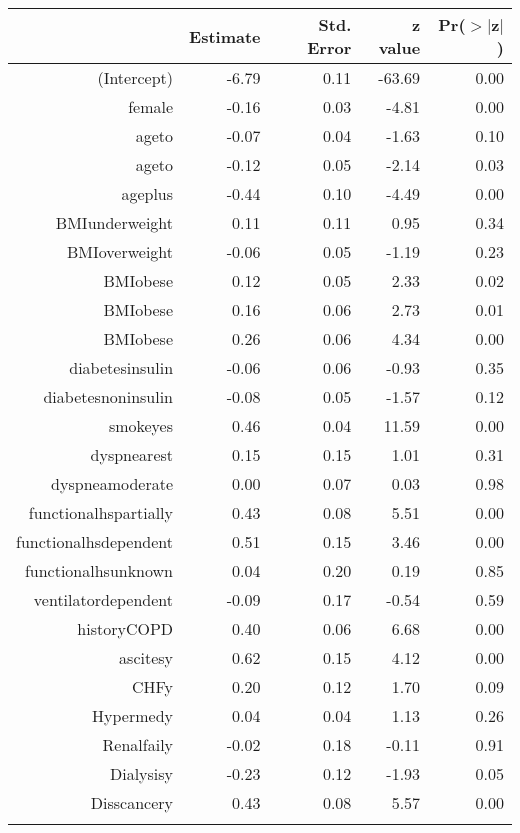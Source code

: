 \bigskip\bigskip
\centering
\begin{tabular}{rrrrr}
  \hline
 & Estimate & Std. Error & z value & Pr($>$$|$z$|$) \\ 
  \hline
(Intercept) & -6.79 & 0.11 & -63.69 & 0.00 \\ 
  female & -0.16 & 0.03 & -4.81 & 0.00 \\ 
  age\-65\-to\-74 & -0.07 & 0.04 & -1.63 & 0.10 \\ 
  age\-75\-to\-84 & -0.12 & 0.05 & -2.14 & 0.03 \\ 
  age\-85\-plus & -0.44 & 0.10 & -4.49 & 0.00 \\ 
  BMI\-underweight & 0.11 & 0.11 & 0.95 & 0.34 \\ 
  BMI\-overweight & -0.06 & 0.05 & -1.19 & 0.23 \\ 
  BMI\-obese\-1 & 0.12 & 0.05 & 2.33 & 0.02 \\ 
  BMI\-obese\-2 & 0.16 & 0.06 & 2.73 & 0.01 \\ 
  BMI\-obese\-3 & 0.26 & 0.06 & 4.34 & 0.00 \\ 
  diabetes\-insulin & -0.06 & 0.06 & -0.93 & 0.35 \\ 
  diabetes\-noninsulin & -0.08 & 0.05 & -1.57 & 0.12 \\ 
  smoke\-yes & 0.46 & 0.04 & 11.59 & 0.00 \\ 
  dyspnea\-rest & 0.15 & 0.15 & 1.01 & 0.31 \\ 
  dyspnea\-moderate & 0.00 & 0.07 & 0.03 & 0.98 \\ 
  functional\-hs\-partially & 0.43 & 0.08 & 5.51 & 0.00 \\ 
  functional\-hs\-dependent & 0.51 & 0.15 & 3.46 & 0.00 \\ 
  functional\-hs\-unknown & 0.04 & 0.20 & 0.19 & 0.85 \\ 
  ventilator\-dependent & -0.09 & 0.17 & -0.54 & 0.59 \\ 
  history\-COPD & 0.40 & 0.06 & 6.68 & 0.00 \\ 
  ascites\-y & 0.62 & 0.15 & 4.12 & 0.00 \\ 
  CHF\-y & 0.20 & 0.12 & 1.70 & 0.09 \\ 
  Hyper\-med\-y & 0.04 & 0.04 & 1.13 & 0.26 \\ 
  Renal\-fail\-y & -0.02 & 0.18 & -0.11 & 0.91 \\ 
  Dialysis\-y & -0.23 & 0.12 & -1.93 & 0.05 \\ 
  Diss\-cancer\-y & 0.43 & 0.08 & 5.57 & 0.00 \\ 
$$
\end{tabular}
